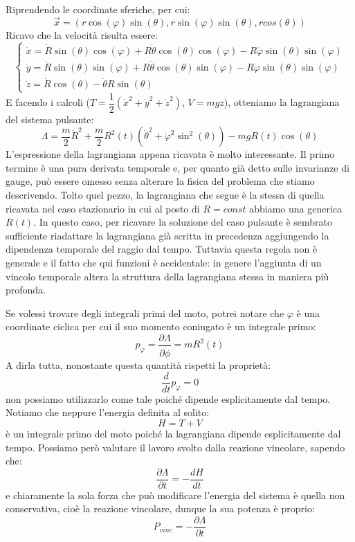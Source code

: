 \documentclass[a4paper,openany]{article}
\begin{document}
	Riprendendo le coordinate sferiche, per cui:
	$$
	\vec{x} = (r\cos(\varphi)\sin(\theta), r\sin(\varphi)\sin(\theta), rcos(\theta))
	$$
	Ricavo che la velocità risulta essere:
	\begin{equation}
		\begin{cases}
			\dot{x} = \dot{R}\sin(\theta)\cos(\varphi)+R\dot{\theta}\cos(\theta)\cos(\varphi) - R\dot{\varphi}\sin(\theta)\sin(\varphi) \\
			\dot{y} = \dot{R}\sin(\theta)\sin(\varphi)+R\dot{\theta}\cos(\theta)\sin(\varphi) - R\dot{\varphi}\sin(\theta)\sin(\varphi) \\
			\dot{z} = \dot{R}\cos(\theta) - \dot{\theta}R\sin(\theta)
		\end{cases}
	\end{equation}
	E facendo i calcoli ($T= \dfrac{1}{2}(\dot{x}^{2}+\dot{y}^{2}+\dot{z}^{2})$, $V = mgz$), otteniamo la lagrangiana del sistema pulsante:
	\begin{equation}
		\Lambda = \dfrac{m}{2}\dot{R}^{2} + \dfrac{m}{2}R^{2}(t)(\dot{\theta}^{2}+\dot{\varphi}^{2}\sin^{2}(\theta)) - mgR(t)\cos(\theta)
		\label{Sferapulsante}
	\end{equation}
	L'espressione della lagrangiana appena ricavata è molto interessante. Il primo termine è una pura derivata temporale e, per quanto già detto sulle invarianze di gauge, può essere omesso senza alterare la fisica del problema che stiamo descrivendo. Tolto quel pezzo, la lagrangiana che segue è la stessa di quella ricavata nel caso stazionario in cui al posto di $R = const$ abbiamo una generica $R(t)$. In questo caso, per ricavare la soluzione del caso pulsante è sembrato sufficiente riadattare la lagrangiana già scritta in precedenza aggiungendo la dipendenza temporale del raggio dal tempo. Tuttavia questa regola non è generale e il fatto che qui funzioni è accidentale: in genere l'aggiunta di un vincolo temporale altera la struttura della lagrangiana stessa in maniera più profonda.
	
	Se volessi trovare degli integrali primi del moto, potrei notare che $\varphi$ è una coordinate ciclica per cui il suo momento coniugato è un integrale primo:
	$$
	p_{\varphi} = \dfrac{\partial \Lambda}{\partial \dot{\phi}} = mR^{2}(t)
	$$
	A dirla tutta, nonostante questa quantità rispetti la proprietà:
	$$
	\dfrac{d}{dt}p_{\varphi} = 0
	$$
	non possiamo utilizzarlo come tale poiché dipende esplicitamente dal tempo. Notiamo che neppure l'energia definita al solito:
	$$
	H = T + V
	$$
	è un integrale primo del moto poiché la lagrangiana dipende esplicitamente dal tempo. Possiamo però valutare il lavoro svolto dalla reazione vincolare, sapendo che:
	$$
	\dfrac{\partial \Lambda}{\partial t} = -\dfrac{dH}{dt}
	$$
	e chiaramente la sola forza che può modificare l'energia del sistema è quella non conservativa, cioè la reazione vincolare, dunque la sua potenza è proprio:
	$$
	P_{vinc} = -\dfrac{\partial \Lambda}{\partial t} 
	$$
	
\end{document}
